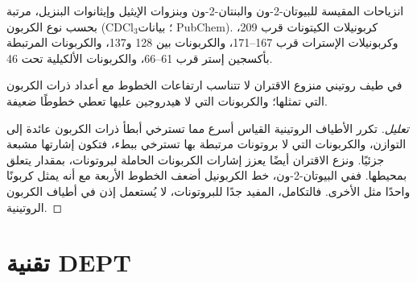 \begin{omfigure}

{\small انزياحات  المقيسة للبيوتان-2-ون والبنتان-2-ون وبنزوات الإيثيل وإيثانوات البنزيل،
مرتبة بحسب نوع الكربون (CDCl$_3$؛ بيانات PubChem). كربونيلات الكيتونات قرب 209، وكربونيلات الإسترات قرب
167--171، والكربونات  بين 128 و137، والكربونات المرتبطة بأكسجين إستر قرب 61--66، 
والكربونات الألكيلية تحت 46.}
\end{omfigure}

\begin{proposition}\label{prop:b2:structure-determination:intensities}
في طيف  روتيني منزوع الاقتران لا تتناسب ارتفاعات الخطوط مع
أعداد ذرات الكربون التي تمثلها؛ والكربونات التي لا هيدروجين عليها تعطي خطوطًا ضعيفة.
\end{proposition}

\begin{proof}[تعليل]
تكرر الأطياف الروتينية القياس أسرع مما تسترخي أبطأ ذرات الكربون عائدة إلى التوازن، 
والكربونات التي لا بروتونات مرتبطة بها تسترخي ببطء، فتكون إشارتها مشبعة جزئيًا. ونزع الاقتران أيضًا
يعزز إشارات الكربونات الحاملة لبروتونات، بمقدار يتعلق بمحيطها.
ففي البيوتان-2-ون، خط الكربونيل أضعف الخطوط الأربعة مع أنه يمثل كربونًا واحدًا مثل
الأخرى. فالتكامل، المفيد جدًا للبروتونات، لا يُستعمل إذن في أطياف الكربون الروتينية.
\end{proof}

\section{تقنية DEPT}

